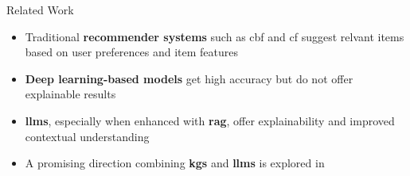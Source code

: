 \begin{tframe}{Related Work}

\begin{itemize}
    \item Traditional \textbf{recommender systems} such as \gls{cbf} and \gls{cf} suggest relvant items based on user preferences and item features \cite{Plexousakis2005, WEI201729, Lu2012}
    \vspace{.1cm}
    \item \textbf{Deep learning-based models} get high accuracy but do not offer explainable results \cite{Zhao2024}
    \vspace{.1cm}
    \item \textbf{\glspl{llm}}, especially when enhanced with \textbf{\gls{rag}}, offer explainability and improved contextual understanding \cite{Deldjoo2024}
    \vspace{.1cm}
    \item A promising direction combining \textbf{\glspl{kg}} and \textbf{\glspl{llm}} is explored in \cite{Yang2024, Pan2024}
\end{itemize}
\end{tframe}